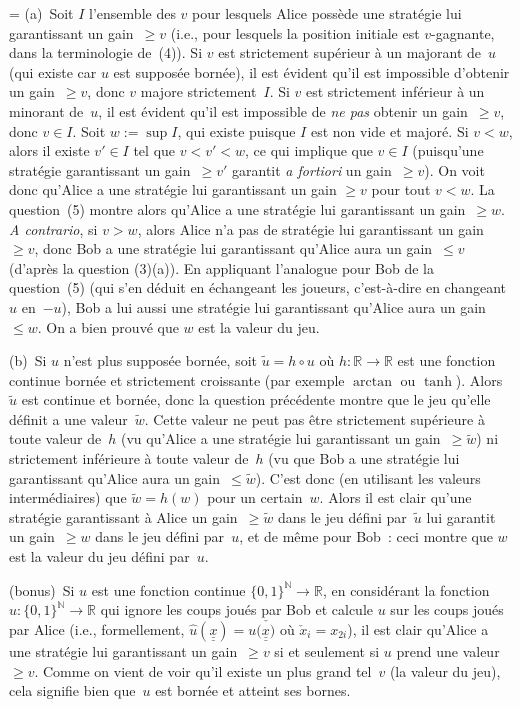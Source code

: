 \documentclass[12pt,a4paper]{article}
\theoremstyle{definition}
\newcommand{\dblunderline}[1]{\underline{\underline{#1}}}
\newif\ifcorrige
\newenvironment{corrige}%
{\ifcorrige\relax\else\setbox0=\vbox\bgroup\fi%
\smallbreak\noindent{\underbar{\textit{Corrigé.}}\quad}}
{{\hbox{}\nobreak\hfill\checkmark}%
\ifcorrige\relax\else\egroup\fi\par}
\begin{document}
\begin{corrige}
(a) Soit $I$ l'ensemble des $v$ pour lesquels Alice possède une
  stratégie lui garantissant un gain $\geq v$ (i.e., pour lesquels la
  position initiale est $v$-gagnante, dans la terminologie de (4)).
  Si $v$ est strictement supérieur à un majorant de $u$ (qui existe
  car $u$ est supposée bornée), il est évident qu'il est impossible
  d'obtenir un gain $\geq v$, donc $v$ majore strictement $I$.  Si $v$
  est strictement inférieur à un minorant de $u$, il est évident qu'il
  est impossible de \emph{ne pas} obtenir un gain $\geq v$, donc
  $v\in I$.  Soit $w := \sup I$, qui existe puisque $I$ est non vide
  et majoré.  Si $v < w$, alors il existe $v' \in I$ tel que $v<v'<w$,
  ce qui implique que $v \in I$ (puisqu'une stratégie garantissant un
  gain $\geq v'$ garantit \textit{a fortiori} un gain $\geq v$).  On
  voit donc qu'Alice a une stratégie lui garantissant un gain $\geq v$
  pour tout $v < w$.  La question (5) montre alors qu'Alice a une
  stratégie lui garantissant un gain $\geq w$.  \textit{A contrario},
  si $v > w$, alors Alice n'a pas de stratégie lui garantissant un
  gain $\geq v$, donc Bob a une stratégie lui garantissant qu'Alice
  aura un gain $\leq v$ (d'après la question (3)(a)).  En appliquant
  l'analogue pour Bob de la question (5) (qui s'en déduit en
  échangeant les joueurs, c'est-à-dire en changeant $u$ en $-u$), Bob
  a lui aussi une stratégie lui garantissant qu'Alice aura un
  gain $\leq w$.  On a bien prouvé que $w$ est la valeur du jeu.

(b) Si $u$ n'est plus supposée bornée, soit $\tilde u = h\circ u$ où
  $h\colon\mathbb{R}\to\mathbb{R}$ est une fonction continue bornée et
  strictement croissante (par exemple $\arctan$ ou $\tanh$).  Alors
  $\tilde u$ est continue et bornée, donc la question précédente
  montre que le jeu qu'elle définit a une valeur $\tilde w$.  Cette
  valeur ne peut pas être strictement supérieure à toute valeur de $h$
  (vu qu'Alice a une stratégie lui garantissant un gain $\geq\tilde
  w$) ni strictement inférieure à toute valeur de $h$ (vu que Bob a
  une stratégie lui garantissant qu'Alice aura un gain $\leq\tilde
  w$).  C'est donc (en utilisant les valeurs intermédiaires) que
  $\tilde w = h(w)$ pour un certain $w$.  Alors il est clair qu'une
  stratégie garantissant à Alice un gain $\geq\tilde w$ dans le jeu
  défini par $\tilde u$ lui garantit un gain $\geq w$ dans le jeu
  défini par $u$, et de même pour Bob : ceci montre que $w$ est la
  valeur du jeu défini par $u$.

(bonus) Si $u$ est une fonction continue $\{0,1\}^{\mathbb{N}} \to
  \mathbb{R}$, en considérant la fonction $\hat u\colon
  \{0,1\}^{\mathbb{N}} \to \mathbb{R}$ qui ignore les coups joués par
  Bob et calcule $u$ sur les coups joués par Alice (i.e.,
  formellement, $\hat u(\dblunderline{x}) = u(\check{\dblunderline{x})}$ où
  $\check x_i = x_{2i}$), il est clair qu'Alice a une stratégie lui
  garantissant un gain $\geq v$ si et seulement si $u$ prend une
  valeur $\geq v$.  Comme on vient de voir qu'il existe un plus grand
  tel $v$ (la valeur du jeu), cela signifie bien que $u$ est bornée et
  atteint ses bornes.
\end{corrige}
\end{document}
